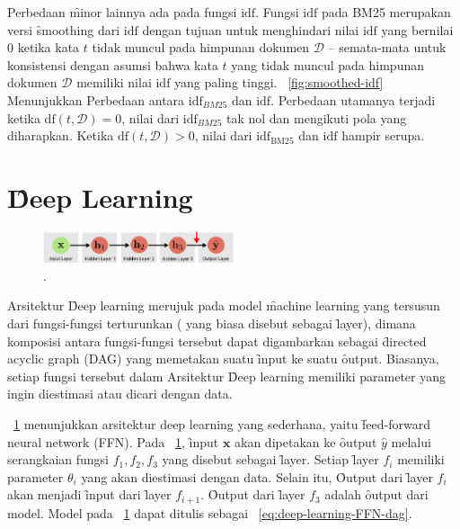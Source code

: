     
    Perbedaan \f{minor} lainnya ada pada fungsi $\text{idf}$. Fungsi $\text{idf}$ pada BM25 merupakan versi \f{smoothing} dari $\text{idf}$ dengan tujuan untuk menghindari nilai $\text{idf}$ yang bernilai 0 ketika kata $t$ tidak muncul pada himpunan dokumen $\mathcal{D}$ -- semata-mata untuk konsistensi dengan asumsi bahwa kata $t$ yang tidak muncul pada himpunan dokumen $\mathcal{D}$ memiliki nilai $\text{idf}$ yang paling tinggi. \pic~\ref{fig:smoothed-idf} Menunjukkan Perbedaan antara $\text{idf}_{BM25}$ dan $\text{idf}$. Perbedaan utamanya terjadi ketika $\text{df}(t,\mathcal{D}) = 0$, nilai dari  $\text{idf}_{BM25}$ tak nol dan mengikuti pola yang diharapkan. Ketika $\text{df}(t,\mathcal{D})>0$, nilai dari $\text{idf}_{\text{BM25}}$ dan $\text{idf}$ hampir serupa.

\section{\f{Deep Learning}}

    \begin{figure}
        \centering
        \includegraphics[width=0.50\textwidth]{assets/pics/dag-dl.png}
        \caption{\license.}
        \label{fig:deep-learning-FFN-dag}
    \end{figure}

    Arsitektur \f{Deep learning} merujuk pada model \f{machine learning} yang tersusun dari fungsi-fungsi terturunkan ( yang biasa disebut sebagai \f{layer}), dimana komposisi antara fungsi-fungsi tersebut dapat digambarkan sebagai \f{directed acyclic graph} (DAG) yang memetakan suatu \f{input} ke suatu \f{output}. Biasanya, setiap fungsi tersebut dalam Arsitektur \f{Deep learning} memiliki parameter yang ingin diestimasi atau dicari dengan data.
    
    \pic~\ref{fig:deep-learning-FFN-dag} menunjukkan arsitektur deep learning yang sederhana, yaitu \f{feed-forward neural network} (FFN). Pada \pic~\ref{fig:deep-learning-FFN-dag}, \f{input} $\mathbf{x}$ akan dipetakan ke \f{output} $\hat y$ melalui serangkaian fungsi $f_1, f_2, f_3$ yang disebut sebagai \f{layer}. Setiap \f{layer} $f_i$ memiliki parameter $\theta_i$ yang akan diestimasi dengan data. Selain itu, \f{Output} dari \f{layer} $f_i$ akan menjadi \f{input} dari \f{layer} $f_{i+1}$. \f{Output} dari \f{layer} $f_3$ adalah \f{output} dari model. Model pada \pic~\ref{fig:deep-learning-FFN-dag} dapat ditulis sebagai \equ~\ref{eq:deep-learning-FFN-dag}.

